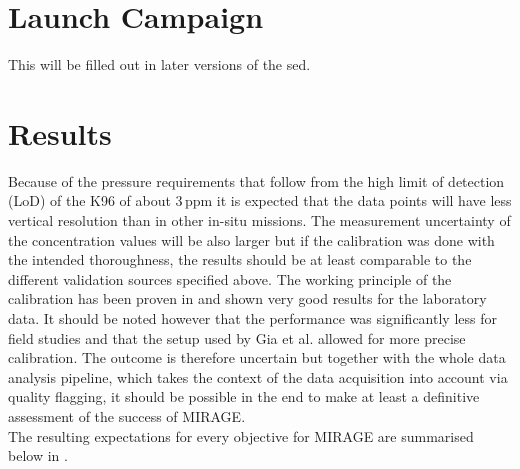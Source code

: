 


\section{Launch Campaign}

This will be filled out in later versions of the \gls{sed}.

\section{Results}

Because of the pressure requirements that follow from the high limit of detection (LoD) of the K96 of about 3\,ppm it is expected that the data points will have less vertical resolution than in other in-situ missions. The measurement uncertainty of the concentration values will be also larger but if the calibration was done with the intended thoroughness, the results should be at least comparable to the different validation sources specified above. The working principle of the calibration has been proven in \cite{gia_accurate_2025} and shown very good results for the laboratory data. It should be noted however that the performance was significantly less for field studies and that the setup used by Gia et al. allowed for more precise calibration. The outcome is therefore uncertain but together with the whole data analysis pipeline, which takes the context of the data acquisition into account via quality flagging, it should be possible in the end to make at least a definitive assessment of the success of MIRAGE. \\
The resulting expectations for every objective for MIRAGE are summarised below in .


